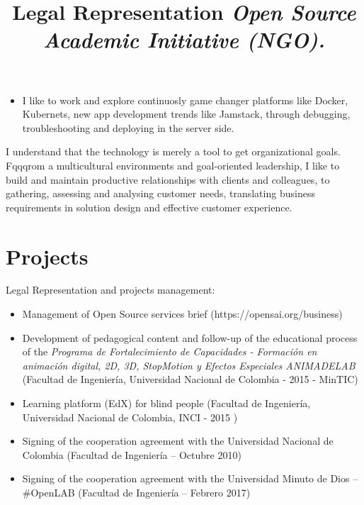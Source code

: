 \documentclass[overlapped,line,final]{res}
\begin{document}
\begin{resume}
\begin{itemize}
    \item I like to work and explore continuosly game changer platforms like Docker, Kubernets, new app development trends like Jamstack, through debugging, troubleshooting and deploying in the server side.
\end{itemize}
    
I understand that the technology is merely a tool to get organizational goals. Fqqqrom a multicultural environments and goal-oriented leadership, I like to build and maintain productive relationships with clients and colleagues, to gathering, assessing and analysing customer needs, translating business requirements in solution design and effective customer experience.

\vspace{0.5cm}
\section{\sc Projects } %
\vspace{0.5cm}
\title{\bf Legal Representation
	\newline \em Open Source Academic Initiative (NGO).
}
\begin{position}
Legal Representation and projects management:

\begin{itemize}
\item Management of Open Source services brief (https://opensai.org/business)
\item Development of pedagogical content and follow-up of the educational process of the \textit{Programa de Fortalecimiento de Capacidades - Formación en animación digital, 2D, 3D, StopMotion y Efectos Especiales ANIMADELAB} (Facultad de Ingeniería, Universidad Nacional de Colombia - 2015 - MinTIC)
\item Learning platform (EdX) for blind people (Facultad de Ingeniería, Universidad Nacional de Colombia, INCI - 2015 )
\item Signing of the cooperation agreement with the Universidad Nacional de Colombia (Facultad de Ingeniería – Octubre 2010)
\item Signing of the cooperation agreement with the Universidad Minuto de Dios – \#OpenLAB (Facultad de Ingeniería – Febrero 2017)
\end{itemize}


\end{position}
\end{resume}
\end{document}
